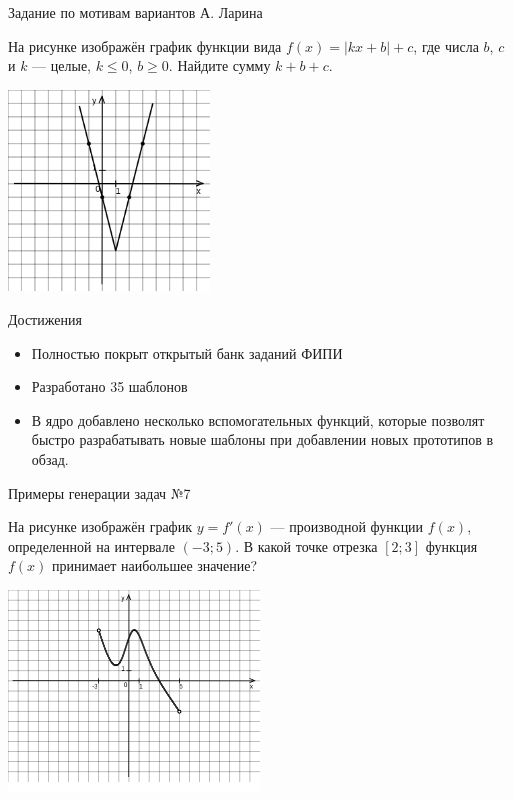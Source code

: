 \documentclass[aspectratio=169]{beamer}
\begin{document}
\begin{frame}{Задание по мотивам вариантов А. Ларина}

    \begin{multicols}{2}
        На рисунке изображён график функции вида $f(x)=|kx+b|+c$, где числа $b$, $c$ и $k$ — целые, $k \leq 0$, $b\geq0$. Найдите сумму $k+b+c$.

        \includegraphics[width=0.4\textwidth]{images/453912618511153n0.png}
    
    \end{multicols}
    
        
    

\end{frame}


\begin{frame}{Достижения}
    \begin{itemize}
        \item Полностью покрыт открытый банк заданий ФИПИ
        \item Разработано 35 шаблонов
        \item В ядро добавлено несколько вспомогательных функций, которые позволят быстро разрабатывать новые шаблоны при добавлении новых прототипов в обзад.
    \end{itemize}
    
\end{frame}

\begin{frame}{Примеры генерации задач №7}
    
    \begin{multicols}{2}
        На рисунке изображён график $y=f'(x)$ — производной функции $f(x)$, определенной на интервале $(-3;5)$. В какой точке отрезка $[2; 3]$ функция $f(x)$ принимает наибольшее значение?

        \includegraphics[width=0.5\textwidth]{images/9299084059373277n0}
    \end{multicols}
          
\end{frame}
\end{document}
